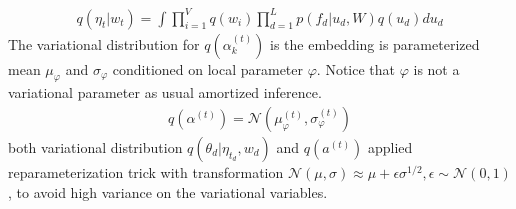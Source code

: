\begin{align}\label{ch5:eq_var_eta}
q(\eta_t|w_t)=\int\prod_{i=1}^{V}q(w_i)\prod_{d=1}^{L}p(f_d|u_d,W)q(u_d)du_d
\end{align}
The variational distribution for $ q(\alpha_k^{(t)}) $ is the embedding is parameterized mean $ \mu_{\varphi} $ and $ \sigma_{\varphi} $ conditioned on local parameter $ \varphi $. Notice that $ \varphi $ is not a variational parameter as usual amortized inference.
\begin{align}\label{ch5:eq_var_alpha}
q(\alpha^{(t)})=\mathcal{N}(\mu_\varphi^{(t)},\sigma_\varphi^{(t)})
\end{align}
both variational distribution $ q(\theta_d|\eta_{t_d}, w_d) $ and $ q(a^{(t)}) $ applied reparameterization trick \cite{kingma_auto-encoding_2014} with transformation $ \mathcal{N}(\mu,\sigma)\approx\mu+\epsilon\sigma^{1/2}, \epsilon\sim \mathcal{N}(0,1) $, to avoid high variance on the variational variables.
